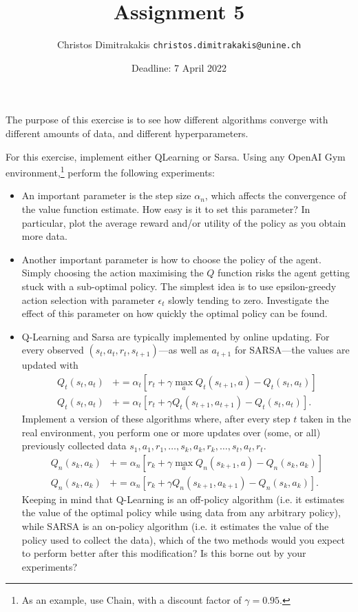 \documentclass[twoside,a4paper]{article}
\begin{document}
\title{Assignment 5}
\author{Christos Dimitrakakis  \texttt{christos.dimitrakakis@unine.ch}}
\date{Deadline: 7 April 2022}
\maketitle

The purpose of this exercise is to see how different algorithms converge with different amounts of data, and different hyperparameters.

For this exercise, implement either QLearning or Sarsa. Using any OpenAI Gym environment,\footnote{As an example, use Chain, with a discount factor of $\gamma = 0.95$.} perform the following experiments:
\begin{itemize}
\item An important parameter is the step size  $\alpha_n$, which affects the convergence of the value function estimate. How easy is it to set this parameter? In particular, plot the average reward and/or utility of the policy as you obtain more data.
\item Another important parameter is how to choose the policy of the agent. Simply choosing the action maximising the $Q$ function risks the agent getting stuck with a sub-optimal policy. The simplest idea is to use epsilon-greedy action selection  with parameter $\epsilon_t$ slowly tending to zero. Investigate the effect of this parameter on how quickly the optimal policy can be found.
\item Q-Learning and Sarsa are typically implemented by online updating. For every observed $(s_t,a_t, r_t, s_{t+1})$---as well as $a_{t+1}$ for SARSA---the values are updated with
  \begin{align}
    Q_t(s_t, a_t) &+=  \alpha_t [r_t + \gamma \max_a Q_t(s_{t+1}, a) -  Q_t(s_t, a_t)] \tag{Q-Learning}\\
    Q_t(s_t, a_t) &+=  \alpha_t [r_t + \gamma Q_t(s_{t+1}, a_{t+1}) -  Q_t(s_t, a_t)] \tag{SARSA}.
  \end{align}
  Implement a version of these algorithms where, after every step $t$ taken in the real environment, you perform one or more updates over (some, or all) previously collected data $s_1, a_1, r_1, \ldots, s_k, a_k, r_k, \ldots, s_t, a_t, r_t$.
  \begin{align}
    Q_n(s_k, a_k) &+=  \alpha_n [r_k + \gamma \max_a Q_n(s_{k+1}, a) -  Q_n(s_k, a_k)] \tag{Q-Learning}\\
    Q_n(s_k, a_k) &+=  \alpha_n [r_k + \gamma Q_n(s_{k+1}, a_{k+1}) -  Q_n(s_k, a_k)] \tag{SARSA}.
  \end{align}
  Keeping in mind that Q-Learning is an off-policy algorithm (i.e. it estimates the value of the optimal policy while using data from any arbitrary policy), while SARSA is an on-policy algorithm (i.e. it estimates the value of the policy used to collect the data), which of the two methods would you expect to perform better after this modification? Is this borne out by your experiments?
\end{itemize}
\end{document}
